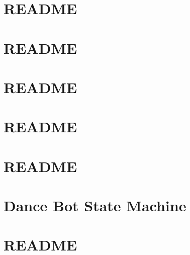 \documentclass[twoside]{book}
\newcommand{\+}{\discretionary{\mbox{\scriptsize$\hookleftarrow$}}{}{}}
\begin{document}
\chapter{R\+E\+A\+D\+ME}
\label{md_smacc_sm_reference_library_sm_fetch_two_table_whiskey_pour_README}

\chapter{R\+E\+A\+D\+ME}
\label{md_smacc_sm_reference_library_sm_packml_README}

\chapter{R\+E\+A\+D\+ME}
\label{md_smacc_sm_reference_library_sm_respira_1_README}

\chapter{R\+E\+A\+D\+ME}
\label{md_smacc_sm_reference_library_sm_ridgeback_barrel_search_1_README}

\chapter{R\+E\+A\+D\+ME}
\label{md_smacc_sm_reference_library_sm_ridgeback_barrel_search_2_README}

\chapter{Dance Bot State Machine}
\label{md_smacc_sm_reference_library_sm_ridgeback_floor_coverage_dynamic_1_launch_readme}

\chapter{R\+E\+A\+D\+ME}
\label{md_smacc_sm_reference_library_sm_ridgeback_floor_coverage_dynamic_1_README}

\end{document}
